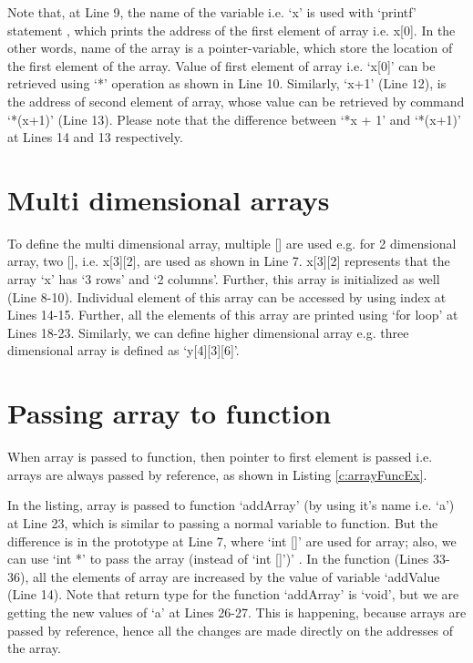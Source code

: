 \begin{explanation}
	Note that, at Line 9, the name of the variable i.e. `x' is used with `printf' statement , which prints the address of the first element of array i.e. x[0]. In the other words, name of the array is a pointer-variable, which store the location of the first element of the array. Value of first element of array i.e. `x[0]' can be retrieved using `*' operation as shown in Line 10. Similarly, `x+1' (Line 12), is the address of second element of array, whose value can be retrieved by command `*(x+1)' (Line 13).  Please note that the difference between `*x + 1' and `*(x+1)' at Lines 14 and 13 respectively. 
\end{explanation}




\section{Multi dimensional arrays}
To define the multi dimensional array, multiple [] are used e.g. for 2 dimensional array, two [], i.e. x[3][2], are used as shown in Line 7. x[3][2] represents that the array `x' has `3 rows' and `2 columns'. Further, this array is initialized as well (Line 8-10). Individual element of this array can be accessed by using index at Lines 14-15. Further, all the elements of this array are  printed using `for loop' at Lines 18-23. Similarly, we can define higher dimensional array e.g. three dimensional array is defined as `y[4][3][6]'. 



\section{Passing array to function}
When array is passed to function, then pointer to first element is passed i.e. arrays are always passed by reference, as shown in Listing \ref{c:arrayFuncEx}. 

\begin{explanation}
	In the listing, array is passed to function `addArray' (by using it's name i.e. `a') at Line 23, which is similar to passing a normal variable to function. But the difference is in the prototype at Line 7, where `int []' are used for array; also, we can use `int *' to pass the array (instead of `int []')' . In the function (Lines 33-36), all the elements of array are increased by the value of variable `addValue (Line 14). Note that return type for the function `addArray' is `void', but we are getting the new values of `a' at Lines 26-27. This is happening, because arrays are passed by reference, hence all the changes are made directly on the addresses of the array. 
\end{explanation}



